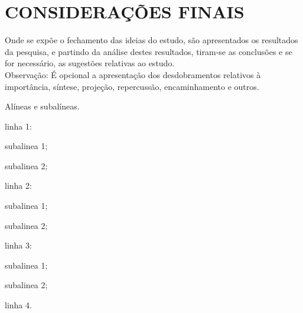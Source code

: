 \chapter{CONSIDERAÇÕES FINAIS}
\label{chp:capitulo6}


Onde se expõe o fechamento das ideias do estudo, são apresentados os resultados da pesquisa, e partindo da análise destes resultados, tiram-se as conclusões e se for necessário, as sugestões relativas ao estudo. \\

Observação: É opcional a apresentação dos desdobramentos relativos à importância, síntese, projeção, repercussão, encaminhamento e outros.

Alíneas e subalíneas.
\bigskip

\begin{alineas}
\item linha 1:
\begin{alineas}
\item subalinea 1;
\item subalinea 2;
\end{alineas}
\item linha 2:
\begin{subalineas}
\item subalinea 1;
\item subalinea 2;
\end{subalineas}
\item linha 3:
\begin{incisos}
\item subalinea 1;
\item subalinea 2;
\end{incisos}
\item linha 4.
\end{alineas}
